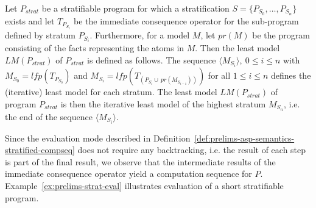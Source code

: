 \begin{definition}
\label{def:prelims-asp-semantics-stratified-compseq}
Let $P_{strat}$ be a stratifiable program for which a stratification $S = \{P_{S_0},\ldots,P_{S_n}\}$ exists and let $T_{P_{S_i}}$ be the immediate consequence operator for the sub-program defined by stratum $P_{S_i}$. Furthermore, for a model $M$, let $pr(M)$ be the program consisting of the facts representing the atoms in $M$.
Then the least model $LM(P_{strat})$ of $P_{strat}$ is defined as follows.
The sequence $\langle M_{S_i} \rangle,\ 0 \leq i \leq n$ with $M_{S_0} = \mathit{lfp}(T_{P_{S_0}})$ and $M_{S_i} = \mathit{lfp}(T_{(P_{S_{i}} \cup\ pr(M_{S_{i-1}}))})$ for all $1 \leq i \leq n$ defines the (iterative) least model for each stratum. The least model $LM(P_{strat})$ of program $P_{strat}$ is then the iterative least model of the highest stratum $M_{S_n}$, i.e. the end of the sequence $\langle M_{S_i} \rangle$.
\end{definition}

Since the evaluation mode described in Definition~\ref{def:prelims-asp-semantics-stratified-compseq} does not require any backtracking, i.e. the result of each step is part of the final result, we observe that the intermediate results of the immediate consequence operator yield a computation sequence for $P$. Example~\ref{ex:prelims-strat-eval} illustrates evaluation of a short stratifiable program.

